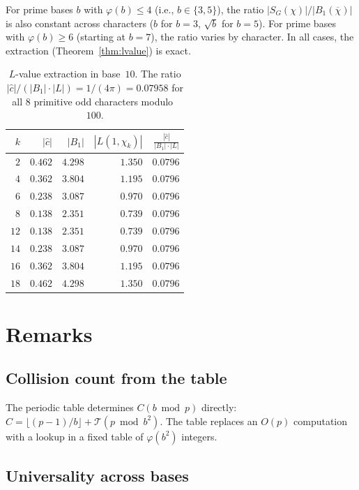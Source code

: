 \documentclass[12pt]{amsart}
\theoremstyle{definition}
\theoremstyle{remark}
\begin{document}
For prime bases $b$ with $\varphi(b) \le 4$
(i.e., $b \in \{3, 5\}$), the ratio
$|S_G(\chi)| / |B_1(\overline{\chi})|$ is also constant
across characters ($b$ for $b = 3$, $\sqrt{b}$ for
$b = 5$). For prime bases with $\varphi(b) \ge 6$
(starting at $b = 7$), the ratio varies by character.
In all cases, the extraction
(Theorem~\ref{thm:lvalue}) is exact.

\begin{table}[ht]
\centering
\begin{tabular}{rrrrr}
\toprule
$k$ & $|\widehat{c}|$ & $|B_1|$ & $|L(1,\chi_k)|$ &
$\frac{|\widehat{c}|}{|B_1| \cdot |L|}$ \\
\midrule
$2$  & $0.462$ & $4.298$ & $1.350$ & $0.0796$ \\
$4$  & $0.362$ & $3.804$ & $1.195$ & $0.0796$ \\
$6$  & $0.238$ & $3.087$ & $0.970$ & $0.0796$ \\
$8$  & $0.138$ & $2.351$ & $0.739$ & $0.0796$ \\
$12$ & $0.138$ & $2.351$ & $0.739$ & $0.0796$ \\
$14$ & $0.238$ & $3.087$ & $0.970$ & $0.0796$ \\
$16$ & $0.362$ & $3.804$ & $1.195$ & $0.0796$ \\
$18$ & $0.462$ & $4.298$ & $1.350$ & $0.0796$ \\
\bottomrule
\end{tabular}
\caption{$L$-value extraction in base~$10$. The ratio
$|\widehat{c}| / (|B_1| \cdot |L|) = 1/(4\pi) = 0.07958$
for all $8$ primitive odd characters modulo~$100$.}
\label{tab:lvalues}
\end{table}

\section{Remarks}

\subsection*{Collision count from the table}

The periodic table determines $C(b \bmod p)$ directly:
$C = \lfloor(p{-}1)/b\rfloor + \mathcal{T}(p \bmod b^2)$.
The table replaces an $O(p)$ computation with a lookup
in a fixed table of $\varphi(b^2)$ integers.

\subsection*{Universality across bases}
\end{document}
